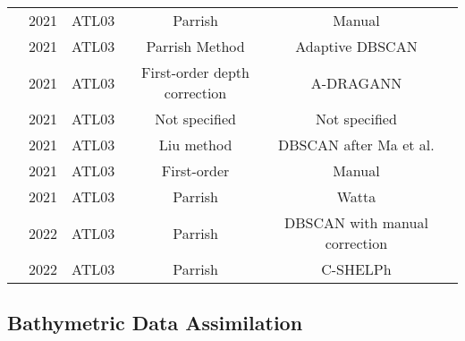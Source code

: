 \begin{table}
\begin{tabular}{rccccc}
            \citeauthor{Babbel2021a}           & 2021 & ATL03   & Parrish                       & Manual                        \\ %
            \citeauthor{Xie2021}               & 2021 & ATL03   & Parrish Method                & Adaptive DBSCAN               \\ %
            \citeauthor{Cao2021}               & 2021 & ATL03   & First-order depth correction  & A-DRAGANN                     \\ %
            \citeauthor{Lee2021}               & 2021 & ATL03   & Not specified                 & Not specified                 \\ %
            \citeauthor{Liu2021}               & 2021 & ATL03   & Liu method                    & DBSCAN after Ma et al.        \\ %
            \citeauthor{Coveney2021a}          & 2021 & ATL03   & First-order                   & Manual                        \\ %
            \citeauthor{Datta2021}             & 2021 & ATL03   & Parrish                       & Watta                         \\ %
            \citeauthor{LeQuilleuc2022b}       & 2022 & ATL03   & Parrish                       & DBSCAN with manual correction \\ %
            \citeauthor{Thomas2022}            & 2022 & ATL03   & Parrish                       & C-SHELPh                      \\
            \bottomrule
      \end{tabular}
\end{table}


\subsection{Bathymetric Data Assimilation}

